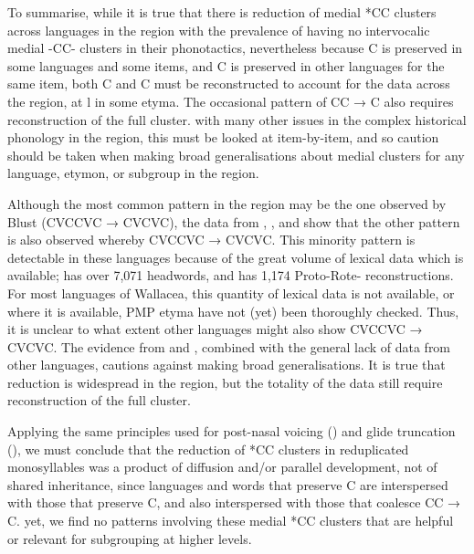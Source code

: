 To summarise, while it is true that there is reduction of  medial
*CC clusters across languages in the region with the prevalence
of having no intervocalic medial -CC- clusters in their phonotactics,
nevertheless because C is preserved in some languages
and some items, and C is preserved in other languages
for the same item,
both C and C must be reconstructed to account for
the data across the region,
at l in some etyma.
The occasional pattern of CC → C also requires
reconstruction of the full cluster.
 with many other issues in the complex historical phonology
in the region, this must be looked at item-by-item,
and so caution should be taken when making broad generalisations
about medial clusters for any language,
etymon, or subgroup in the region.

Although the most common pattern in the region may be the one
observed by Blust (CVCCVC → CVCVC),
the data from ,
, and  show that the other pattern is also
observed whereby CVCCVC → CVCVC.
This minority pattern is detectable in these languages because
of the great volume of lexical data which is available; \citet{GrimesGrimes2020}
has over 7,071 headwords,
and \citet{Edwards2021} has 1,174 Proto-Rote- reconstructions.
For most languages of Wallacea,
this quantity of lexical data is not available,
or where it is available,
PMP etyma have not (yet) been thoroughly checked.
Thus, it is unclear to what extent other languages might also
show CVCCVC → CVCVC.
The evidence from 
and , combined with the general lack of data from
other languages, cautions against making broad generalisations.
It is true that reduction is widespread in the region,
but the totality of the data still require reconstruction of the full cluster.

Applying the same principles used for post-nasal voicing ()
and glide truncation (),
we must conclude that the reduction of *CC clusters in reduplicated
monosyllables was a product of diffusion and/or parallel development,
not of shared inheritance,
since languages and words that preserve C are interspersed
with those that preserve C,
and also interspersed with those that coalesce CC → C.
 yet, we find no patterns involving these medial *CC clusters
that are helpful or relevant for subgrouping at higher levels.

